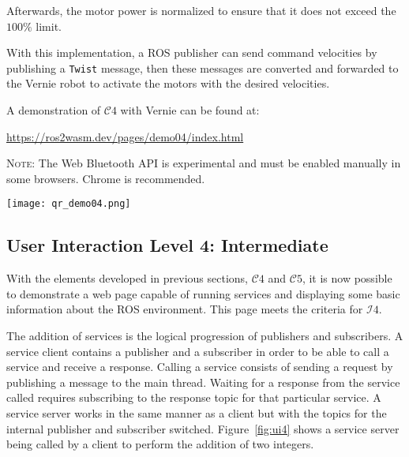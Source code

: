         Afterwards, the motor power is normalized to ensure that it does not exceed the $100\%$ limit. 
        
        With this implementation, a \ac{ROS} publisher can send command velocities by publishing a \texttt{Twist} message, then these messages are converted and forwarded to the Vernie robot to activate the motors with the desired velocities.

        \vspace{1em}
        \begin{tcolorbox}[title=Example 7]
            \begin{minipage}[t]{0.87\linewidth}
                \vspace*{0.5\baselineskip}
                A demonstration of $\mathcal{C}4$ with Vernie can be found at:
                
                \href{https://ros2wasm.dev/pages/demo04/index.html}{\textsf{https://ros2wasm.dev/pages/demo04/index.html}}

                \textsc{Note:} The Web Bluetooth \ac{API} is experimental and must be enabled manually in some browsers. Chrome is recommended.
            \end{minipage}\hfill%
            \begin{minipage}[t]{0.1\linewidth}
                \vspace{14pt}
                \texttt{[image: qr\_demo04.png]}
            \end{minipage}
        \end{tcolorbox}



        \subsection{User Interaction Level 4: Intermediate}

        With the elements developed in previous sections, $\mathcal{C}4$ and $\mathcal{C}5$, it is now possible to demonstrate a web page capable of running services and displaying some basic information about the \ac{ROS} environment. This page meets the criteria for $\mathcal{I}4$.

        The addition of services is the logical progression of publishers and subscribers. A service client contains a publisher and a subscriber in order to be able to call a service and receive a response. Calling a service consists of sending a request by publishing a message to the main thread. Waiting for a response from the service called requires subscribing to the response topic for that particular service. A service server works in the same manner as a client but with the topics for the internal publisher and subscriber switched. Figure~\ref{fig:ui4} shows a service server being called by a client to perform the addition of two integers.


